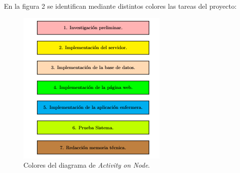 \documentclass[
11pt, %
]{charter}
\begin{document}


En la figura 2 se identifican mediante distintos colores las tareas del proyecto:

\begin{figure}[htpb]
\centering 
\includegraphics[width=.7\textwidth]{./Figuras/AoN-2.png}
\caption{Colores del diagrama de \textit{Activity on Node}.}
\label{fig:AoN0}

\end{figure}
\end{document}
